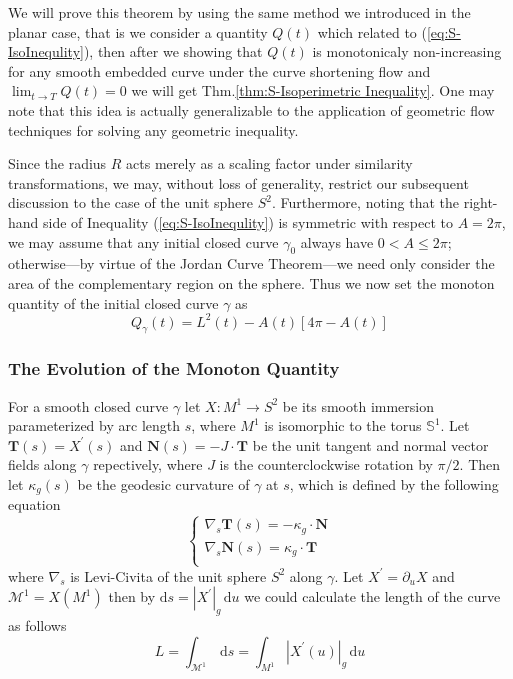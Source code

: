 We will prove this theorem by using the same method we introduced in the planar case, that is we consider a quantity $Q(t)$ which related to (\ref{eq:S-IsoInequlity}), then after we showing that $Q(t)$ is monotonicaly non-increasing for any smooth embedded curve under the curve shortening flow and $\lim_{t\to T}Q(t)=0$ we will get Thm.\ref{thm:S-Isoperimetric Inequality}. One may note that this idea is actually generalizable to the application of geometric flow techniques for solving any geometric inequality.

Since the radius $R$ acts merely as a scaling factor under similarity transformations, we may, without loss of generality, restrict our subsequent discussion to the case of the unit sphere $S^2$. Furthermore, noting that the right-hand side of Inequality (\ref{eq:S-IsoInequlity}) is symmetric with respect to $A=2\pi$, we may assume that any initial closed curve $\gamma_0$ always have $0<A\le 2\pi$; otherwise—by virtue of the Jordan Curve Theorem—we need only consider the area of the complementary region on the sphere. Thus we now set the monoton quantity of the initial closed curve $\gamma$ as
\begin{equation*}
    Q_\gamma(t)=L^2(t)-A(t)\left[4\pi-A(t)\right]
\end{equation*}

\subsubsection{The Evolution of the Monoton Quantity}

For a smooth closed curve $\gamma$ let $X:M^1\to S^2$ be its smooth immersion parameterized by arc length $s$, where $M^1$ is isomorphic to the torus $\mathbb{S}^1$. Let $\mathbf{T}(s)=X^\prime(s)$ and $\mathbf{N}(s)=-J\cdot\mathbf{T}$ be the unit tangent and normal vector fields along $\gamma$ repectively, where $J$ is the counterclockwise rotation by $\pi/2$. Then let $\kappa_g (s)$ be the geodesic curvature of $\gamma$ at $s$, which is defined by the following equation
\begin{equation}\label{eq:Geodesic k}
    \begin{cases}
        \nabla_s \mathbf{T}(s)=-\kappa_g\cdot\mathbf{N}\\
        \nabla_s \mathbf{N}(s)=\kappa_g\cdot\mathbf{T}\\
    \end{cases}
\end{equation}
where $\nabla_s$ is Levi-Civita of the unit sphere $S^2$ along $\gamma$. Let $X^\prime=\partial_u X$ and $\mathcal{M}^1=X(M^1)$ then by $\mathrm{d}s={\left|X^\prime\right|}_g\,\mathrm{d}u$ we could calculate the length of the curve as follows
\begin{equation*}
    L=\int_{\mathcal{M}^1}\,\mathrm{d}s=\int_{M^1}{\left|X^\prime(u)\right|}_g\,\mathrm{d}u
\end{equation*}

